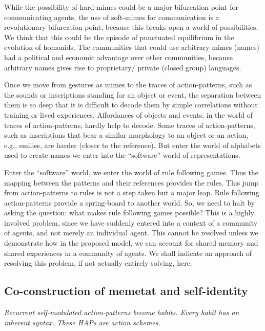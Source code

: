 While the possibility of hard-mimes could be a major bifurcation point for communicating agents, the use of soft-mimes for communication is a revolutionary bifurcation point, because this breaks open a world of possibilities. 
We think that this could be the episode of punctuated equilibrium\cite{gould1977punctuated} in the evolution of homonids. The communities that could use arbitrary mimes (names) had a political and economic advantage over other communities, because arbitrary names gives rise to proprietary/ private (closed group) languages.\cite{corballis2014recursive}

Once we move from gestures as mimes to the traces of action-patterns, such as the sounds or inscriptions standing for an object or event, the separation between them is so deep that it is difficult to decode them by simple correlations without training or lived experiences. 
Affordances of objects and events, in the world of traces of action-patterns, hardly help to decode. Some traces of action-patterns, such as inscriptions that bear a similar morphology to an object or an action, e.g., smilies, are harder (closer to the reference). But enter the world of alphabets used to create names we enter into the ``software'' world of representations.

Enter the ``software'' world, we enter the world of rule following games. Thus the mapping between the patterns and their references provides the rules. 
This jump from action-patterns to rules is not a step taken but a major leap. 
Rule following action-patterns provide a spring-board to another world.
So, we need to halt by asking the question: what makes rule following games possible?
This is a highly involved problem, since we have suddenly entered into a context of a community of agents, and not merely an individual agent. 
This cannot be resolved unless we demonstrate how in the proposed model, we can account for shared memory and shared experiences in a community of agents.
We shall indicate an approach of resolving this problem, if not actually entirely solving, here.

\subsection{Co-construction of memetat and self-identity}

\emph{Recurrent self-modulated action-patterns become habits. Every habit has an inherent syntax. These HAPs are \textit{action schemes}\cite{piaget1970genetic}.}

